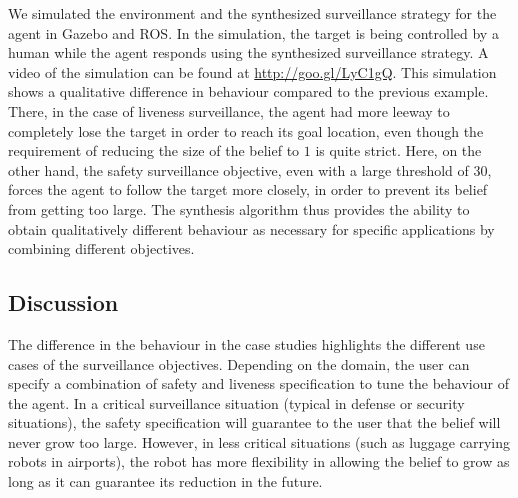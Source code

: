 We simulated the environment and the synthesized surveillance strategy for the agent in Gazebo and ROS. In the  simulation, the target is being controlled by a human while the agent responds using the synthesized surveillance strategy. A video of the simulation can be found at \url{http://goo.gl/LyC1gQ}. This simulation shows a qualitative difference in behaviour compared to the previous example. There, in the case of liveness surveillance, the agent had more leeway to completely lose the target in order to reach its goal location, even though the requirement of reducing the size of the belief to $1$ is quite strict. Here, on the other hand, the safety surveillance objective, even with a large threshold of $30$, forces the agent to follow the target more closely, in order to prevent its belief from getting too large. The synthesis algorithm thus provides the ability to obtain qualitatively different behaviour as necessary for specific applications by combining different objectives. 

\subsection{Discussion}
The difference in the behaviour in the case studies highlights the different use cases of the surveillance objectives. Depending on the domain, the user can specify a combination of safety and liveness specification to tune the behaviour of the agent. In a critical surveillance situation (typical in defense or security situations), the safety specification will guarantee to the user that the belief will never grow too large. However, in less critical situations (such as luggage carrying robots in airports), the robot has more flexibility in allowing the belief to grow as long as it can guarantee its reduction in the future. 